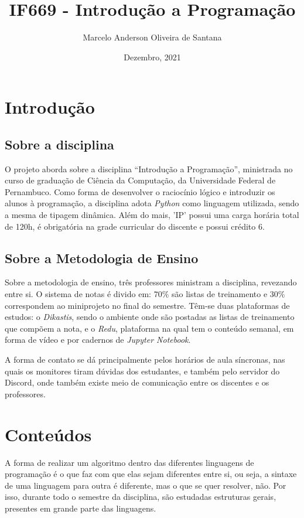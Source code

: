 \documentclass[a4paper, 12pt]{article} %
\title{IF669 - Introdução a Programação}
\author{Marcelo Anderson Oliveira de Santana}
\date{Dezembro, 2021}
\begin{document}
\maketitle

\section{Introdução}
\subsection{Sobre a disciplina}
O projeto aborda sobre a disciplina “Introdução a Programação”, ministrada no curso de graduação de Ciência da Computação, da Universidade Federal de Pernambuco. Como forma de desenvolver o raciocínio lógico e introduzir os alunos à programação, a disciplina adota \textit{Python} como linguagem utilizada, sendo a mesma de tipagem dinâmica. Além do mais, 'IP' possui uma carga horária total de 120h, é obrigatória na grade curricular do discente e possui crédito 6. 

\subsection{Sobre a Metodologia de Ensino}
Sobre a metodologia de ensino, três professores ministram a disciplina, revezando entre si. O sistema de notas é divido em: $70\%$ são listas de treinamento e $30\%$ correspondem ao miniprojeto no final do semestre. 
Têm-se duas plataformas de estudos: o \textit{Dikastis}, sendo o ambiente onde são postadas as listas de treinamento que compõem a nota, e o \textit{Redu}, plataforma na qual tem o conteúdo semanal, em forma de vídeo e por cadernos de \textit{Jupyter Notebook}.

A forma de contato se dá principalmente pelos horários de aula síncronas, nas quais os monitores tiram dúvidas dos estudantes, e também pelo servidor do Discord, onde também existe meio de comunicação entre os discentes e os professores.

\section{Conteúdos}
A forma de realizar um algoritmo dentro das diferentes linguagens de programação é o que faz com que elas sejam diferentes entre si, ou seja, a sintaxe de uma linguagem para outra é diferente, mas o que se quer resolver, não. Por isso, durante todo o semestre da disciplina, são estudadas estruturas gerais, presentes em grande parte das linguagens. 
\end{document}
